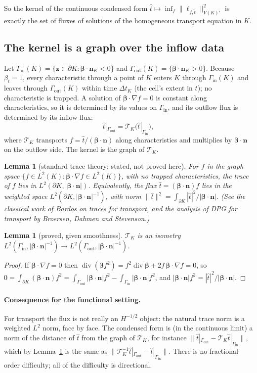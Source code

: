\documentclass[11pt]{article}
\newtheorem{lemma}[proposition]{Lemma}
\theoremstyle{remark}
\theoremstyle{definition}
\newcommand{\bbeta}{\boldsymbol{\beta}}
\newcommand{\bn}{\boldsymbol{n}}
\newcommand{\bz}{\boldsymbol{z}}
\newcommand{\that}{\hat{t}}
\newcommand{\Tr}{\mathcal{T}}
\newcommand{\Gin}{\Gamma_{\mathrm{in}}}
\newcommand{\Gout}{\Gamma_{\mathrm{out}}}
\DeclareMathOperator{\divz}{div}
\begin{document}
So the kernel of the continuous condensed form $\that\mapsto\inf_f\|\ell_{f,\that}\|^2_{V(K)'}$ is exactly the set
of fluxes of solutions of the homogeneous transport equation in $K$.

\subsection{The kernel is a graph over the inflow data}

Let $\Gin(K)=\{\bz\in\partial K:\bbeta\cdot\bn_K<0\}$ and $\Gout(K)=\{\bbeta\cdot\bn_K>0\}$.  Because $\beta_t=1$,
every characteristic through a point of $K$ enters $K$ through $\Gin(K)$ and leaves through $\Gout(K)$ within time
$\Delta t_K$ (the cell's extent in $t$); no characteristic is trapped.  A solution of $\bbeta\cdot\nabla f=0$ is
constant along characteristics, so it is determined by its values on $\Gin$, and its outflow flux is determined by its
inflow flux:
\[
  \that|_{\Gout} = \Tr_K\bigl(\that|_{\Gin}\bigr),
\]
where $\Tr_K$ transports $f=\that/(\bbeta\cdot\bn)$ along characteristics and multiplies by $\bbeta\cdot\bn$ on the
outflow side.  The kernel is the graph of $\Tr_K$.

\begin{lemma}[standard trace theory; stated, not proved here]\label{lem:trace}
For $f$ in the graph space $\{f\in L^2(K):\bbeta\cdot\nabla f\in L^2(K)\}$, with no trapped characteristics, the trace
of $f$ lies in $L^2(\partial K,|\bbeta\cdot\bn|)$.  Equivalently, the flux $\that=(\bbeta\cdot\bn)f$ lies in the
weighted space $L^2(\partial K,|\bbeta\cdot\bn|^{-1})$, with norm $\|\that\|^2 = \int_{\partial K}|\that|^2/|\bbeta\cdot\bn|$.
(See the classical work of Bardos on traces for transport, and the analysis of DPG for transport by Broersen,
Dahmen and Stevenson.)
\end{lemma}

\begin{lemma}[proved, given smoothness]\label{lem:isometry}
$\Tr_K$ is an isometry $L^2(\Gin,|\bbeta\cdot\bn|^{-1})\to L^2(\Gout,|\bbeta\cdot\bn|^{-1})$.
\end{lemma}
\begin{proof}
If $\bbeta\cdot\nabla f=0$ then $\divz(\bbeta f^2) = f^2\divz\bbeta + 2f\,\bbeta\cdot\nabla f = 0$, so
$0=\int_{\partial K}(\bbeta\cdot\bn)f^2 = \int_{\Gout}|\bbeta\cdot\bn|f^2 - \int_{\Gin}|\bbeta\cdot\bn| f^2$, and
$|\bbeta\cdot\bn|f^2 = |\that|^2/|\bbeta\cdot\bn|$.
\end{proof}

\paragraph{Consequence for the functional setting.}  For transport the flux is not really an $H^{-1/2}$ object: the
natural trace norm is a weighted $L^2$ norm, face by face.  The condensed form is (in the continuous limit) a norm of
the distance of $\that$ from the graph of $\Tr_K$, for instance $\|\that|_{\Gout}-\Tr_K\that|_{\Gin}\|$, which by
Lemma~\ref{lem:isometry} is the same as $\|\Tr_K^{-1}\that|_{\Gout}-\that|_{\Gin}\|$.  There is no fractional-order
difficulty; all of the difficulty is directional.
\end{document}
